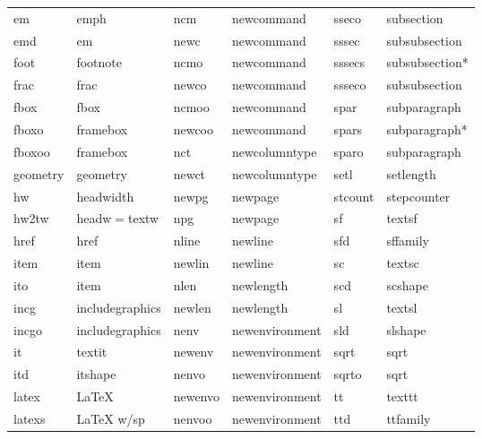 \documentclass[letterpaper,11pt]{article}
\begin{document}
\begin{table}[H]
{\begin{tabular}{llllll}
em               & emph              & ncm        & newcommand     & sseco           & subsection \\ 
emd              & em                & newc       & newcommand     & sssec           & subsubsection \\
foot             & footnote          & ncmo       & newcommand     & sssecs          & subsubsection* \\
frac             & frac              & newco      & newcommand     & ssseco          & subsubsection \\
fbox             & fbox              & ncmoo      & newcommand     & spar            & subparagraph \\
fboxo            & framebox          & newcoo     & newcommand     & spars           & subparagraph* \\
fboxoo           & framebox          & nct        & newcolumntype  & sparo           & subparagraph \\
geometry         & geometry          & newct      & newcolumntype  & setl            & setlength \\
hw               & headwidth         & newpg      & newpage        & stcount         & stepcounter \\
hw2tw            & headw\(=\)textw   & npg        & newpage        & sf              & textsf \\
href             & href              & nline      & newline        & sfd             & sffamily \\
item             & item              & newlin     & newline        & sc              & textsc \\
ito              & item              & nlen       & newlength      & scd             & scshape \\
incg             & includegraphics   & newlen     & newlength      & sl              & textsl \\
incgo            & includegraphics   & nenv       & newenvironment & sld             & slshape \\
it               & textit            & newenv     & newenvironment & sqrt            & sqrt \\
itd              & itshape           & nenvo      & newenvironment & sqrto           & sqrt \\
latex            & LaTeX             & newenvo    & newenvironment & tt              & texttt \\
latexs           & LaTeX w/sp        & nenvoo     & newenvironment & ttd             & ttfamily \\

\end{tabular}}
\end{table}
\end{document}
